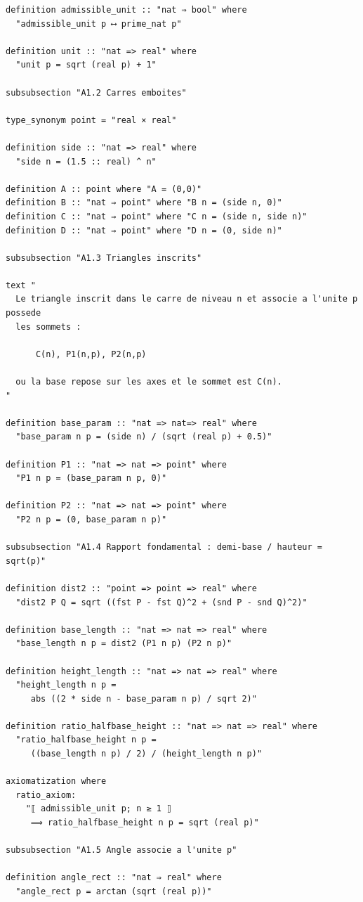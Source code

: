 \documentclass[12pt,a4paper]{article}
\theoremstyle{definition}
\theoremstyle{remark}
\begin{document}
\begin{verbatim}
definition admissible_unit :: "nat ⇒ bool" where
  "admissible_unit p ⟷ prime_nat p"

definition unit :: "nat => real" where
  "unit p = sqrt (real p) + 1"

subsubsection "A1.2 Carres emboites"

type_synonym point = "real × real"

definition side :: "nat => real" where
  "side n = (1.5 :: real) ^ n"

definition A :: point where "A = (0,0)"
definition B :: "nat ⇒ point" where "B n = (side n, 0)"
definition C :: "nat ⇒ point" where "C n = (side n, side n)"
definition D :: "nat ⇒ point" where "D n = (0, side n)"

subsubsection "A1.3 Triangles inscrits"

text "
  Le triangle inscrit dans le carre de niveau n et associe a l'unite p possede
  les sommets :

      C(n), P1(n,p), P2(n,p)

  ou la base repose sur les axes et le sommet est C(n).
"

definition base_param :: "nat => nat=> real" where
  "base_param n p = (side n) / (sqrt (real p) + 0.5)"

definition P1 :: "nat => nat => point" where
  "P1 n p = (base_param n p, 0)"

definition P2 :: "nat => nat => point" where
  "P2 n p = (0, base_param n p)"

subsubsection "A1.4 Rapport fondamental : demi-base / hauteur = sqrt(p)"

definition dist2 :: "point => point => real" where
  "dist2 P Q = sqrt ((fst P - fst Q)^2 + (snd P - snd Q)^2)"

definition base_length :: "nat => nat => real" where
  "base_length n p = dist2 (P1 n p) (P2 n p)"

definition height_length :: "nat => nat => real" where
  "height_length n p =
     abs ((2 * side n - base_param n p) / sqrt 2)"

definition ratio_halfbase_height :: "nat => nat => real" where
  "ratio_halfbase_height n p =
     ((base_length n p) / 2) / (height_length n p)"

axiomatization where
  ratio_axiom:
    "⟦ admissible_unit p; n ≥ 1 ⟧
     ⟹ ratio_halfbase_height n p = sqrt (real p)"

subsubsection "A1.5 Angle associe a l'unite p"

definition angle_rect :: "nat ⇒ real" where
  "angle_rect p = arctan (sqrt (real p))"


\end{verbatim}
\end{document}
